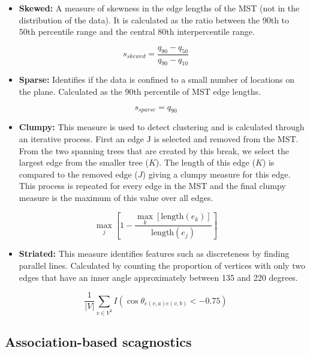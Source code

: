 \begin{itemize}
\tightlist
\item
  \textbf{Skewed:} A measure of skewness in the edge lengths of the MST (not in the distribution of the data). It is calculated as the ratio between the 90th to 50th percentile range and the central 80th interpercentile range.
\end{itemize}

\[s_{skewed} = \frac{q_{90}-{q_{50}}}{q_{90}-q_{10}}\]

\begin{itemize}
\tightlist
\item
  \textbf{Sparse:} Identifies if the data is confined to a small number of locations on the plane. Calculated as the 90th percentile of MST edge lengths.
\end{itemize}

\[s_{sparse}= q_{90}\]

\begin{itemize}
\tightlist
\item
  \textbf{Clumpy:} This measure is used to detect clustering and is calculated through an iterative process. First an edge J is selected and removed from the MST. From the two spanning trees that are created by this break, we select the largest edge from the smaller tree (\(K\)). The length of this edge (\(K\)) is compared to the removed edge (\(J\)) giving a clumpy measure for this edge. This process is repeated for every edge in the MST and the final clumpy measure is the maximum of this value over all edges.
\end{itemize}

\[\max_{j}\left[ 1-\frac{\max_{k}[\mbox{length}(e_k)]}{\mbox{length}(e_j)}\right]\]

\begin{itemize}
\tightlist
\item
  \textbf{Striated:} This measure identifies features such as discreteness by finding parallel lines. Calculated by counting the proportion of vertices with only two edges that have an inner angle approximately between 135 and 220 degrees.
\end{itemize}

\[\frac1{|V|}\sum_{v \in V^{2}}I(\cos\theta_{e(v,a)e(v,b)}<-0.75)\]

\subsection{Association-based scagnostics}\label{association-based-scagnostics}

